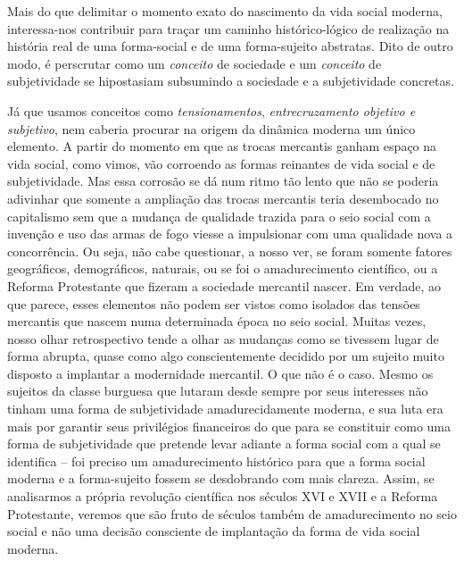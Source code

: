 Mais do que delimitar o momento exato do nascimento da vida social
moderna, interessa-nos contribuir para traçar um caminho
histórico-lógico de realização na história real de uma forma-social e de
uma forma-sujeito abstratas. Dito de outro modo, é perscrutar como um
\emph{conceito} de sociedade e um \emph{conceito} de subjetividade se
hipostasiam subsumindo a sociedade e a subjetividade concretas.

Já que usamos conceitos como \emph{tensionamentos},
\emph{entrecruzamento objetivo e subjetivo}, nem caberia procurar na
origem da dinâmica moderna um único elemento. A partir do momento em que
as trocas mercantis ganham espaço na vida social, como vimos, vão
corroendo as formas reinantes de vida social e de subjetividade. Mas
essa corrosão se dá num ritmo tão lento que não se poderia adivinhar que
somente a ampliação das trocas mercantis teria desembocado no
capitalismo sem que a mudança de qualidade trazida para o seio social
com a invenção e uso das armas de fogo viesse a impulsionar com uma
qualidade nova a concorrência. Ou seja, não cabe questionar, a nosso
ver, se foram somente fatores geográficos, demográficos, naturais, ou se
foi o amadurecimento científico, ou a Reforma Protestante que fizeram a
sociedade mercantil nascer. Em verdade, ao que parece, esses elementos
não podem ser vistos como isolados das tensões mercantis que nascem numa
determinada época no seio social. Muitas vezes, nosso olhar
retrospectivo tende a olhar as mudanças como se tivessem lugar de forma
abrupta, quase como algo conscientemente decidido por um sujeito muito
disposto a implantar a modernidade mercantil. O que não é o caso. Mesmo
os sujeitos da classe burguesa que lutaram desde sempre por seus
interesses não tinham uma forma de subjetividade amadurecidamente
moderna, e sua luta era mais por garantir seus privilégios financeiros
do que para se constituir como uma forma de subjetividade que pretende
levar adiante a forma social com a qual se identifica -- foi preciso um
amadurecimento histórico para que a forma social moderna e a
forma-sujeito fossem se desdobrando com mais clareza. Assim, se
analisarmos a própria revolução científica nos séculos XVI e XVII e a
Reforma Protestante, veremos que são fruto de séculos também de
amadurecimento no seio social e não uma decisão consciente de
implantação da forma de vida social moderna.

